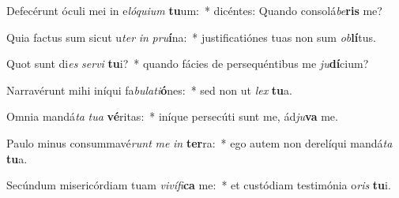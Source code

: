 \item Defecérunt óculi mei in e\textit{ló}\textit{qui}\textit{um} \textbf{tu}um:~* dicéntes: Quando consolá\textit{be}\textbf{ris} me?
\item Quia factus sum sicut u\textit{ter} \textit{in} \textit{pru}\textbf{í}na:~* justificatiónes tuas non sum \textit{ob}\textbf{lí}tus.
\item Quot sunt di\textit{es} \textit{ser}\textit{vi} \textbf{tu}i?~* quando fácies de persequéntibus me \textit{ju}\textbf{dí}cium?
\item Narravérunt mihi iníqui fa\textit{bu}\textit{la}\textit{ti}\textbf{ó}nes:~* sed non ut \textit{lex} \textbf{tu}a.
\item Omnia mandá\textit{ta} \textit{tu}\textit{a} \textbf{vé}ritas:~* iníque persecúti sunt me, ád\textit{ju}\textbf{va} me.
\item Paulo minus consummavé\textit{runt} \textit{me} \textit{in} \textbf{ter}ra:~* ego autem non derelíqui mandá\textit{ta} \textbf{tu}a.
\item Secúndum misericórdiam tuam \textit{vi}\textit{ví}\textit{fi}\textbf{ca} me:~* et custódiam testimónia o\textit{ris} \textbf{tu}i.
